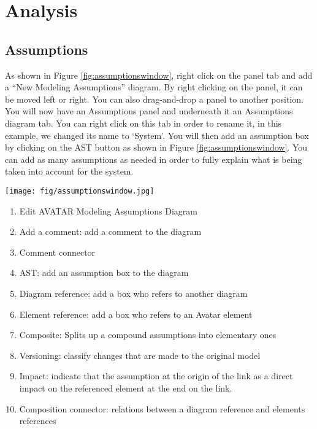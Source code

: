 \documentclass[12pt]{article}
\begin{document}
\section{Analysis}
\subsection{Assumptions}

As shown in Figure \ref{fig:assumptionswindow}, right click on the panel tab and add a “New Modeling Assumptions” diagram. By right clicking on the panel, it can be moved left or right. You can also drag-and-drop a panel to another position. You will now have an Assumptions panel and underneath it an Assumptions diagram tab. You can right click on this tab in order to rename it, in this example, we changed its name to ‘System’. You will then add an assumption box by clicking on the AST button as shown in Figure \ref{fig:assumptionswindow}. You can add as many assumptions as needed in order to fully explain what is being taken into account for the system. 

\begin{figure*}[htbp]
\centering
\texttt{[image: fig/assumptionswindow.jpg]}
\caption{Assumptions Window} \label{fig:assumptionswindow}
\end{figure*}

\begin{enumerate}
\item Edit AVATAR Modeling Assumptions Diagram
\item  Add a comment: add a comment to the diagram
\item  Comment connector
\item  AST: add an assumption box to the diagram
\item  Diagram reference: add a box who refers to another diagram
\item  Element reference: add a box who refers to an Avatar element
\item  Composite: Splits up a compound assumptions into elementary ones
\item  Versioning: classify changes that are made to the original model
\item  Impact: indicate that the assumption at the origin of the link as a direct impact on the referenced element at the end on the link. 
\item Composition connector: relations between a diagram reference and elements references
\end{enumerate}
\end{document}
